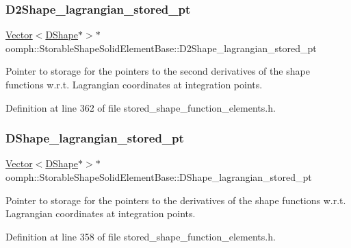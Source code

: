 \subsubsection{\texorpdfstring{D2\+Shape\+\_\+lagrangian\+\_\+stored\+\_\+pt}{D2Shape\_lagrangian\_stored\_pt}}
{\footnotesize\ttfamily \hyperlink{classoomph_1_1Vector}{Vector}$<$\hyperlink{classoomph_1_1DShape}{D\+Shape}$\ast$$>$$\ast$ oomph\+::\+Storable\+Shape\+Solid\+Element\+Base\+::\+D2\+Shape\+\_\+lagrangian\+\_\+stored\+\_\+pt\hspace{0.3cm}{\ttfamily [private]}}



Pointer to storage for the pointers to the second derivatives of the shape functions w.\+r.\+t. Lagrangian coordinates at integration points. 



Definition at line 362 of file stored\+\_\+shape\+\_\+function\+\_\+elements.\+h.

\mbox{\label{classoomph_1_1StorableShapeSolidElementBase_aea43da502d9ec0f38f5018a9f73039af}} 
\subsubsection{\texorpdfstring{D\+Shape\+\_\+lagrangian\+\_\+stored\+\_\+pt}{DShape\_lagrangian\_stored\_pt}}
{\footnotesize\ttfamily \hyperlink{classoomph_1_1Vector}{Vector}$<$\hyperlink{classoomph_1_1DShape}{D\+Shape}$\ast$$>$$\ast$ oomph\+::\+Storable\+Shape\+Solid\+Element\+Base\+::\+D\+Shape\+\_\+lagrangian\+\_\+stored\+\_\+pt\hspace{0.3cm}{\ttfamily [private]}}



Pointer to storage for the pointers to the derivatives of the shape functions w.\+r.\+t. Lagrangian coordinates at integration points. 



Definition at line 358 of file stored\+\_\+shape\+\_\+function\+\_\+elements.\+h.

\mbox{\label{classoomph_1_1StorableShapeSolidElementBase_a0817df47c8e2d67c75407a03744504e8}} 
